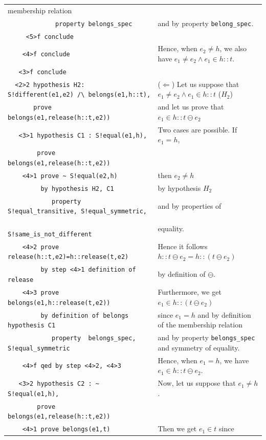 \documentclass[submission,copyright,creativecommons]{eptcs}
\begin{document}
\begin{table}
\begin{center}
{\begin{tabular}{|ll|}
membership relation \\
\verb+             property belongs_spec+ & and by property \verb+belong_spec+.\\
\verb+     <5>f conclude+ & \\
\verb+    <4>f conclude+ & Hence, when $e_2 \neq h$, we also have $e_1 \neq e_2
\land e_1 \in h::t$.\\
\verb+   <3>f conclude+ & \\
\verb+  <2>2 hypothesis H2: S!different(e1,e2) /\ belongs(e1,h::t),+
& ($\Leftarrow$) Let us suppose that $e_1 \neq e_2 \land e_1 \in
h::t$ ($H_2$) \\
\verb+       prove belongs(e1,release(h::t,e2))+ & and let us prove
that $e_1 \in h::t \ominus e_2$ \\
\verb+   <3>1 hypothesis C1 : S!equal(e1,h),+ & Two cases are
possible. If $e_1=h$,\\
\verb+        prove belongs(e1,release(h::t,e2))+ & \\
\verb+    <4>1 prove ~ S!equal(e2,h)+ & then $e_2 \neq h$\\
\verb+         by hypothesis H2, C1+ &  by
hypothesis $H_2$\\
\verb+            property S!equal_transitive, S!equal_symmetric,+ 
& and by properties of \\
\verb+                     S!same_is_not_different+
& equality.\\
\verb+    <4>2 prove release(h::t,e2)=h::release(t,e2)+ & 
Hence it follows $h::t \ominus e_2 = h:: (t \ominus e_2)$ \\
\verb+         by step <4>1 definition of release+ & by definition of $\ominus$.\\
\verb+    <4>3 prove belongs(e1,h::release(t,e2))+ & Furthermore, we
get $e_1 \in h::(t \ominus e_2)$ \\
\verb+         by definition of belongs hypothesis C1+ & since $e_1=h$
and by definition of the membership relation \\
\verb+            property  belongs_spec, S!equal_symmetric+ & 
and by property \verb+belongs_spec+ and symmetry of equality.\\
\verb+    <4>f qed by step <4>2, <4>3+ & Hence, when $e_1=h$, we have $e_1 \in h::t \ominus e_2$.\\
\verb+   <3>2 hypothesis C2 : ~ S!equal(e1,h),+ & Now, let us suppose
that $e_1 \neq h$.\\
\verb+        prove belongs(e1,release(h::t,e2))+ & \\
\verb+    <4>1 prove belongs(e1,t)+ & Then we get $e_1 \in t$ since

\end{tabular}}
\end{center}
\end{table}
\end{document}
